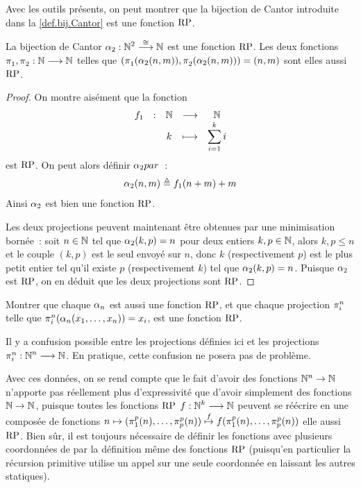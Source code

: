 Avec les outils présents, on peut montrer que la bijection de Cantor introduite
dans la \cref{def.bij.Cantor} est une fonction $\operatorname{RP}$.

\begin{proposition}\label{prop.Cantor.bij}
  La bijection de Cantor $\alpha_{2} : \displaystyle \mathbb N^2 \overset{\cong}{\longrightarrow} \mathbb N$ est une fonction
  $\operatorname{RP}$. Les deux fonctions
  $\mathop{\pi_{1}^{}},\mathop{\pi_{2}^{}} : \displaystyle \mathbb N \longrightarrow \mathbb N$ telles que
  $(\mathop{\pi_{1}^{}}(\alpha_{2}(n,m)),\mathop{\pi_{2}^{}}(\alpha_{2}(n,m))) = (n,m)$ sont elles aussi
  $\operatorname{RP}$.
\end{proposition}

\begin{proof}
  On montre aisément que la fonction
  \[\makeFun{f_1}{\bN}{\bN}{k}{\displaystyle\sum_{i = 1}^k i}\]
  est $\operatorname{RP}$. On peut alors définir $\alpha_{2} par$~:
  \[\alpha_{2}(n,m) \triangleq f_1(n+m)+m\]
  Ainsi $\alpha_{2}$ est bien une fonction $\operatorname{RP}$.

  Les deux projections peuvent maintenant être obtenues par une minimisation
  bornée~: soit $n \in \mathbb N$ tel que $\alpha_{2}(k,p) = n$ pour deux entiers
  $k,p\in \mathbb N$, alors $k,p \leq n$ et le couple $(k,p)$ est le seul envoyé
  sur $n$, donc $k$ (respectivement $p$) est le plus petit entier tel qu'il
  existe $p$ (respectivement $k$) tel que $\alpha_{2}(k,p) = n$. Puisque
  $\alpha_{2}$ est $\operatorname{RP}$, on en déduit que les deux projections sont $\operatorname{RP}$.
\end{proof}

\begin{exercise}
  Montrer que chaque $\alpha_{n}$ est aussi une fonction $\operatorname{RP}$, et que chaque
  projection $\mathop{\pi_{i}^{n}}$ telle que
  $\mathop{\pi_{i}^{n}}(\alpha_{n}(x_1,\ldots,x_n))=x_i$, est une fonction $\operatorname{RP}$.
\end{exercise}

\begin{remark}
  Il y a confusion possible entre les projections définies ici et les
  projections $\mathop{\pi_{i}^{n}} : \displaystyle \mathbb N^n \longrightarrow \mathbb N$. En pratique, cette
  confusion ne posera pas de problème.
\end{remark}

Avec ces données, on se rend compte que le fait d'avoir des fonctions
$\mathbb N^n \to \mathbb N$ n'apporte pas réellement plus d'expressivité que d'avoir
simplement des fonctions $\mathbb N \to \mathbb N$, puisque toutes les fonctions $\operatorname{RP}$
$f : \displaystyle \mathbb N^k \longrightarrow \mathbb N$ peuvent se réécrire en une composée de fonctions
$n \mapsto (\mathop{\pi_{1}^{p}}(n),\ldots,\mathop{\pi_{p}^{p}}(n))
\overset{f}{\mapsto} f(\mathop{\pi_{1}^{p}}(n),\ldots,\mathop{\pi_{p}^{p}}(n))$ elle aussi
$\operatorname{RP}$. Bien sûr, il est toujours nécessaire de définir les fonctions avec
plusieurs coordonnées de par la définition même des fonctions $\operatorname{RP}$ (puisqu'en
particulier la récursion primitive utilise un appel sur une seule coordonnée en
laissant les autres statiques).

